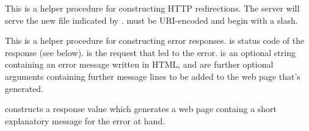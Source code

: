 \begin{desc}
  This is a helper procedure for constructing HTTP redirections.  The
  server will serve the new file indicated by .
   must be URI-encoded and begin with a slash.
\end{desc}

\begin{desc}
  This is a helper procedure for constructing error responses.
   is status code of the response (see below). 
  is the request that led to the error.   is an optional
  string containing an error message written in HTML, and 
  are further optional arguments containing further message lines to
  be added to the web page that's generated.

   constructs a response value which generates
  a web page containg a short explanatory message for the error at hand.
\end{desc}

